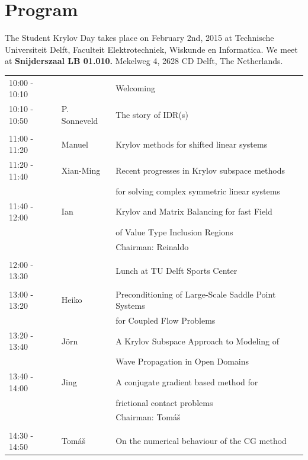 \documentclass{article}
\begin{document}
\section*{Program}
The Student Krylov Day takes place on February 2nd, 2015 at Technische Universiteit Delft, 
    Faculteit Elektrotechniek, Wiskunde en Informatica. We meet at \textbf{Snijderszaal LB 01.010.}
Mekelweg 4, 2628 CD Delft, The Netherlands. \\ 
\begin{table}[h]
\begin{tabular}{lll}
10:00 - 10:10 &  & Welcoming \\ [0.5ex]
10:10 - 10:50 & P. Sonneveld & The story of IDR(s) \\ [0.5ex]
\hline \\ [-1.5ex]
11:00 - 11:20 & Manuel & Krylov methods for shifted linear systems \\ [0.5ex]
11:20 - 11:40 & Xian-Ming & Recent progresses in Krylov subspace methods\\ 
                        & & for solving complex symmetric linear systems\\  [0.5ex]
11:40 - 12:00 & Ian & Krylov and Matrix Balancing for fast Field \\ 
              &     & of Value Type Inclusion Regions\\  [0.5ex]
& & \hfill \small{Chairman: Reinaldo }  \\
\hline \\ [-1.5ex]
12:00 - 13:30 & & Lunch at TU Delft Sports Center \\ [0.5ex]
\hline \\ [-1.5ex]
13:00 - 13:20 & Heiko & Preconditioning of Large-Scale Saddle Point Systems\\
                    & & for Coupled Flow Problems\\ [0.5ex]
13:20 - 13:40 &J\"orn & A Krylov Subspace Approach to Modeling of \\
                     & & Wave Propagation in Open Domains\\ [0.5ex]
13:40 - 14:00 & Jing & A conjugate gradient based method for \\
                   & & frictional contact problems\\ [0.5ex]
& & \hfill \small{Chairman: Tom{\'a}{\v s}} \\
\hline \\ [-1.5ex]
14:30 - 14:50 & Tom{\'a}{\v s} & On the numerical behaviour of the CG method\\ [0.5ex]

\end{tabular}
\end{table}
\end{document}
